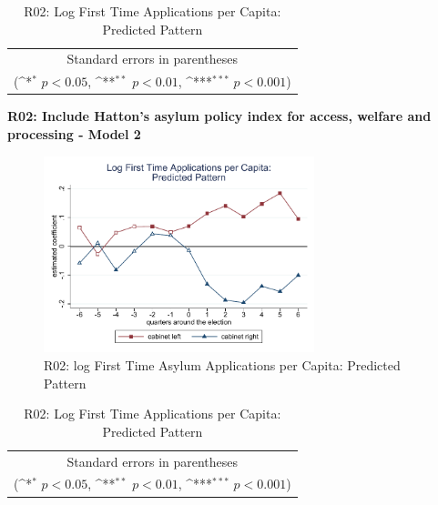 \documentclass[10pt,a4paper]{scrartcl}
\begin{document}
\begin{table}[!ht]\centering
	\renewcommand{\arraystretch}{1.25}
	\def\sym#1{\ifmmode^{#1}\else\(^{#1}\)\fi}
	\caption{R02: Log First Time Applications per Capita: Predicted Pattern}
	\begin{tabular}{l*{2}{c}}
		\hline\hline
		
		\hline\hline
		\multicolumn{3}{c}{\footnotesize Standard errors in parentheses} \\
		\multicolumn{3}{c}{\footnotesize (\sym{*} \(p<0.05\), \sym{**} \(p<0.01\), \sym{***} \(p<0.001\))}\\
	\end{tabular}
\end{table}

\clearpage
\textbf{R02: Include Hatton's asylum policy index for access, welfare and processing - Model 2}
\begin{figure}[!ht]
	\centering
	\includegraphics[width=0.7\textwidth]{figures_edited/app_graph2_R02.pdf}
	\caption{R02: log First Time Asylum Applications per Capita: Predicted Pattern}
\end{figure}

\begin{table}[!ht]\centering
	\footnotesize
	\renewcommand{\arraystretch}{1.2}
	\def\sym#1{\ifmmode^{#1}\else\(^{#1}\)\fi}
	\caption{R02: Log First Time Applications per Capita: Predicted Pattern}
	\begin{tabular}{l*{2}{c}}
		\hline\hline
		
		\hline\hline
		\multicolumn{3}{c}{\footnotesize Standard errors in parentheses} \\
		\multicolumn{3}{c}{\footnotesize (\sym{*} \(p<0.05\), \sym{**} \(p<0.01\), \sym{***} \(p<0.001\))} \\
	\end{tabular}
\end{table}
\end{document}
